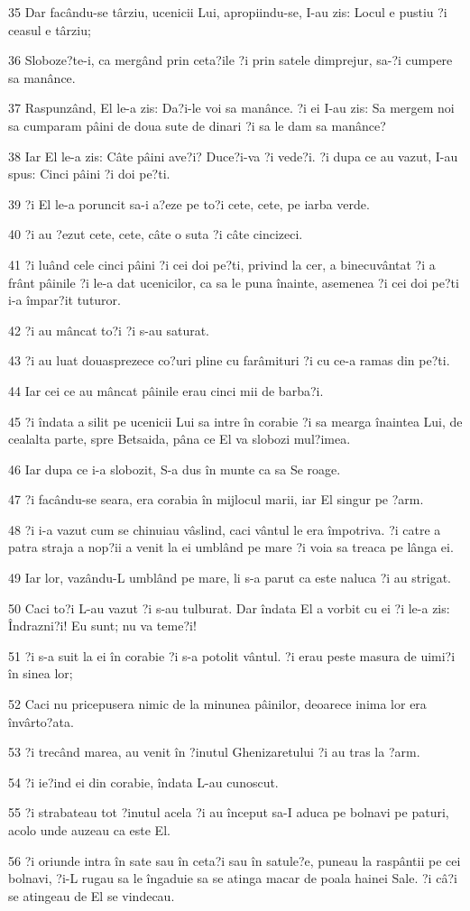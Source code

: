 \par 35 Dar facându-se târziu, ucenicii Lui, apropiindu-se, I-au zis: Locul e pustiu ?i ceasul e târziu;
\par 36 Sloboze?te-i, ca mergând prin ceta?ile ?i prin satele dimprejur, sa-?i cumpere sa manânce.
\par 37 Raspunzând, El le-a zis: Da?i-le voi sa manânce. ?i ei I-au zis: Sa mergem noi sa cumparam pâini de doua sute de dinari ?i sa le dam sa manânce?
\par 38 Iar El le-a zis: Câte pâini ave?i? Duce?i-va ?i vede?i. ?i dupa ce au vazut, I-au spus: Cinci pâini ?i doi pe?ti.
\par 39 ?i El le-a poruncit sa-i a?eze pe to?i cete, cete, pe iarba verde.
\par 40 ?i au ?ezut cete, cete, câte o suta ?i câte cincizeci.
\par 41 ?i luând cele cinci pâini ?i cei doi pe?ti, privind la cer, a binecuvântat ?i a frânt pâinile ?i le-a dat ucenicilor, ca sa le puna înainte, asemenea ?i cei doi pe?ti i-a împar?it tuturor.
\par 42 ?i au mâncat to?i ?i s-au saturat.
\par 43 ?i au luat douasprezece co?uri pline cu farâmituri ?i cu ce-a ramas din pe?ti.
\par 44 Iar cei ce au mâncat pâinile erau cinci mii de barba?i.
\par 45 ?i îndata a silit pe ucenicii Lui sa intre în corabie ?i sa mearga înaintea Lui, de cealalta parte, spre Betsaida, pâna ce El va slobozi mul?imea.
\par 46 Iar dupa ce i-a slobozit, S-a dus în munte ca sa Se roage.
\par 47 ?i facându-se seara, era corabia în mijlocul marii, iar El singur pe ?arm.
\par 48 ?i i-a vazut cum se chinuiau vâslind, caci vântul le era împotriva. ?i catre a patra straja a nop?ii a venit la ei umblând pe mare ?i voia sa treaca pe lânga ei.
\par 49 Iar lor, vazându-L umblând pe mare, li s-a parut ca este naluca ?i au strigat.
\par 50 Caci to?i L-au vazut ?i s-au tulburat. Dar îndata El a vorbit cu ei ?i le-a zis: Îndrazni?i! Eu sunt; nu va teme?i!
\par 51 ?i s-a suit la ei în corabie ?i s-a potolit vântul. ?i erau peste masura de uimi?i în sinea lor;
\par 52 Caci nu pricepusera nimic de la minunea pâinilor, deoarece inima lor era învârto?ata.
\par 53 ?i trecând marea, au venit în ?inutul Ghenizaretului ?i au tras la ?arm.
\par 54 ?i ie?ind ei din corabie, îndata L-au cunoscut.
\par 55 ?i strabateau tot ?inutul acela ?i au început sa-I aduca pe bolnavi pe paturi, acolo unde auzeau ca este El.
\par 56 ?i oriunde intra în sate sau în ceta?i sau în satule?e, puneau la raspântii pe cei bolnavi, ?i-L rugau sa le îngaduie sa se atinga macar de poala hainei Sale. ?i câ?i se atingeau de El se vindecau.

